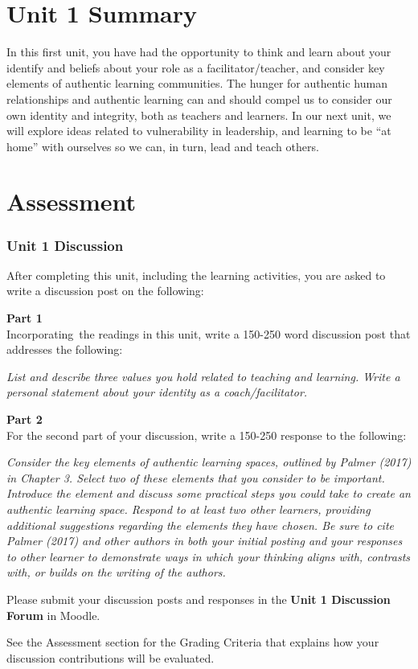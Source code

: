\documentclass[
]{book}
\begin{document}
\hypertarget{unit-1-summary}{%
\section*{Unit 1 Summary}\label{unit-1-summary}}

In this first unit, you have had the opportunity to think and learn about your identify and beliefs about your role as a facilitator/teacher, and consider key elements of authentic learning communities. The hunger for authentic human relationships and authentic learning can and should compel us to consider our own identity and integrity, both as teachers and learners. In our next unit, we will explore ideas related to vulnerability in leadership, and learning to be ``at home'' with ourselves so we can, in turn, lead and teach others.

\hypertarget{assessment}{%
\section*{Assessment}\label{assessment}}

\begin{assessment}
\hypertarget{unit-1-discussion}{%
\subsubsection*{Unit 1 Discussion}\label{unit-1-discussion}}

After completing this unit, including the learning activities, you are
asked to write a discussion post on the following:

\textbf{Part 1}\\
Incorporating~the readings in this unit, write a 150-250 word discussion
post that addresses the following:

\emph{List and describe three values you hold related to teaching and
learning. Write a personal statement about your identity as a
coach/facilitator.}

\textbf{Part 2}\\
For the second part of your discussion, write a 150-250 response to the
following:

\emph{Consider the key elements of authentic learning spaces, outlined
by Palmer (2017) in Chapter 3. Select two of these elements that you
consider to be important. Introduce the element and discuss some
practical steps you could take to create an authentic learning space.
Respond to at least two other learners, providing additional suggestions
regarding the elements they have chosen. Be sure to cite Palmer (2017)
and other authors in both your initial posting and your responses to
other learner to demonstrate ways in which your thinking aligns with,
contrasts with, or builds on the writing of the authors.}

Please submit your discussion posts and responses in the \textbf{Unit 1
Discussion Forum} in Moodle.

See the Assessment section for the Grading Criteria that explains how
your discussion contributions will be evaluated.
\end{assessment}
\end{document}
